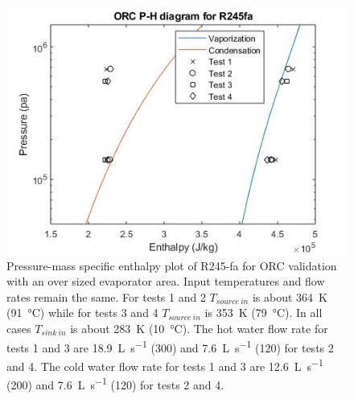 \begin{figure}[p]
	\centering

	\includegraphics[width=\textwidth]{figures/VerificationPH02}
	\caption{Pressure-mass specific enthalpy plot of R245-fa for ORC validation with an over sized evaporator area. Input temperatures and flow rates remain the same. 
	For tests 1 and 2 $T_{source\ in}$ is about \SI{364}{\kelvin} (\SI{91}{\degreeCelsius})
	while for tests 3 and 4 $T_{source\ in}$ is \SI{353}{\kelvin} (\SI{79}{\degreeCelsius}). 
	In all cases $T_{sink\ in}$ is about \SI{283}{\kelvin} (\SI{10}{\degreeCelsius}). 
	The hot water flow rate for tests 1 and 3 are \SI{18.9}{\liter\per\second} (\SI{300}{\gpm})
	and	\SI{7.6}{\liter\per\second} (\SI{120}{\gpm}) for tests 2 and 4. 
	The cold water flow rate for tests 1 and 3 are \SI{12.6}{\liter\per\second} (\SI{200}{\gpm})
	and \SI{7.6}{\liter\per\second} (\SI{120}{\gpm}) for tests 2 and 4.}
	\label{fig:verifcation_ph02}
\end{figure}